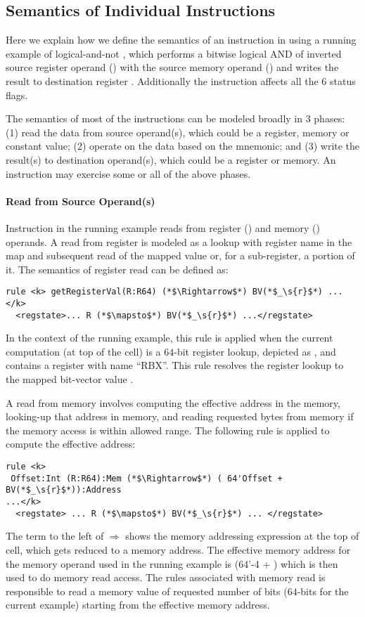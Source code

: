 \subsection{Semantics of Individual Instructions}
Here we explain how we define the semantics of an instruction in \K using a running example of logical-and-not , which performs a bitwise logical AND of inverted source register operand () with the source memory operand () and writes the result to destination register . Additionally the instruction affects all the $6$ status flags.


%

The semantics of most of the instructions can be modeled broadly in $3$ phases: (1) read the data from source operand(s), which could be a register, memory or constant value; (2) operate on the data based on the mnemonic; and (3) write the result(s) to destination operand(s), which could be a register or memory. An instruction may exercise some or all of the above phases. 
   
\paragraph{Read from Source Operand(s)}
Instruction in the running example reads from  register () and memory () operands. A read from register is modeled as a lookup with register name in the  map and subsequent read of the mapped value or,
for a sub-register, a portion of it. The semantics of register read can be defined as:  
\begin{lstlisting}[style=KRULE]
rule <k> getRegisterVal(R:R64) (*$\Rightarrow$*) BV(*$_\s{r}$*) ...</k>
  <regstate>... R (*$\mapsto$*) BV(*$_\s{r}$*) ...</regstate>
\end{lstlisting}
 In the context of the running example, this rule
is applied when the current computation (at top of the  cell) is a $64$-bit register
lookup, depicted as  , and  contains a register
with name ``RBX''. This rule resolves the register lookup  to the mapped bit-vector value . 

A read from memory involves computing the effective address in the memory, looking-up that address in memory, and reading requested bytes from memory if the memory access is within allowed range.
The following rule is applied to compute the effective address:
\begin{lstlisting}[style=KRULE]
rule <k> 
 Offset:Int (R:R64):Mem (*$\Rightarrow$*) ( 64'Offset + BV(*$_\s{r}$*)):Address
...</k>
  <regstate> ... R (*$\mapsto$*) BV(*$_\s{r}$*) ... </regstate>
\end{lstlisting}
The term to the left of $\Rightarrow$ shows the memory addressing expression at the 
top of  cell, which gets reduced to a memory address. The effective memory address for the memory operand used in the running example is (64'-4 + ) which is then used to do memory read access. 
The rules associated with memory read is responsible to read a memory value of requested number of bits ($64$-bits for the current example) starting from the effective memory address. 
 
